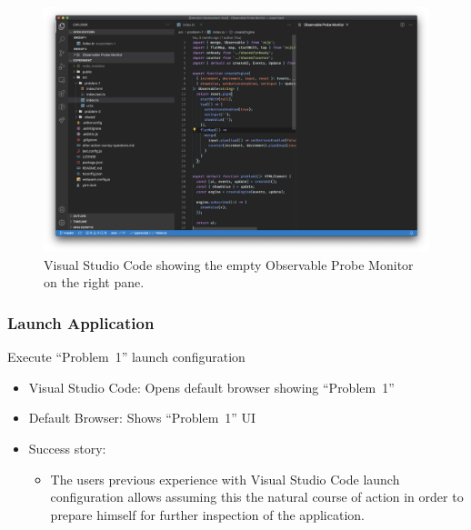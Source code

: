 \documentclass[sigplan,screen,nonacm,review]{acmart}
\begin{document}
\begin{figure}[ht]
	\centering
	\includegraphics[width=\columnwidth]{walkthrough-screenshots/step5-2.png}
	\Description{}
	\caption{Visual Studio Code showing the empty Observable Probe Monitor on the right pane.}
	\label{fig:walkthrough-screesnhot-step-5-2}
\end{figure}

\subsubsection{Launch Application}
Execute ``Problem~1'' launch configuration

\begin{itemize}
	\item Visual Studio Code: Opens default browser showing ``Problem~1''
	\item Default Browser: Shows ``Problem~1'' UI
	\item Success story:
	      \begin{itemize}
	      	\item The users previous experience with Visual Studio Code launch configuration allows assuming this the natural course of action in order to prepare himself for further inspection of the application.
	      \end{itemize}
\end{itemize}
\end{document}
